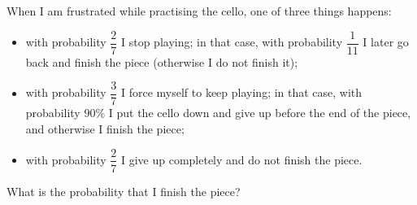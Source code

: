 When I am frustrated while practising the cello, one of three things happens:
\begin{itemize}
\item with probability $\dfrac27$ I stop playing; in that case, with probability $\dfrac{1}{11}$ I later go back and finish the piece (otherwise I do not finish it);
\item with probability $\dfrac37$ I force myself to keep playing; in that case, with probability $90\%$ I put the cello down and give up before the end of the piece, and otherwise I finish the piece;
\item with probability $\dfrac27$ I give up completely and do not finish the piece.
\end{itemize}
What is the probability that I finish the piece?
